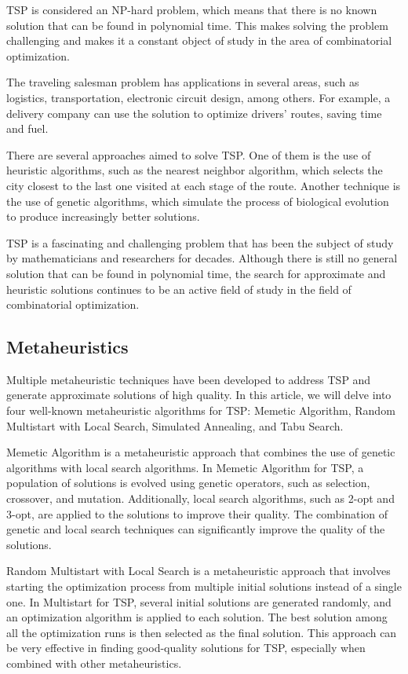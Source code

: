 \documentclass[conference]{IEEEtran}
\begin{document}
TSP is considered an NP-hard problem, which means that there is no known solution that can be found in polynomial time. This makes solving the problem challenging and makes it a constant object of study in the area of combinatorial optimization.

The traveling salesman problem has applications in several areas, such as logistics, transportation, electronic circuit design, among others. For example, a delivery company can use the solution to optimize drivers' routes, saving time and fuel.

There are several approaches aimed to solve TSP. One of them is the use of heuristic algorithms, such as the nearest neighbor algorithm, which selects the city closest to the last one visited at each stage of the route. Another technique is the use of genetic algorithms, which simulate the process of biological evolution to produce increasingly better solutions.

TSP is a fascinating and challenging problem that has been the subject of study by mathematicians and researchers for decades. Although there is still no general solution that can be found in polynomial time, the search for approximate and heuristic solutions continues to be an active field of study in the field of combinatorial optimization.

\subsection{Metaheuristics}

Multiple metaheuristic techniques have been developed to address TSP and generate approximate solutions of high quality. In this article, we will delve into four well-known metaheuristic algorithms for TSP: Memetic Algorithm, Random Multistart with Local Search, Simulated Annealing, and Tabu Search.

Memetic Algorithm is a metaheuristic approach that combines the use of genetic algorithms with local search algorithms. In Memetic Algorithm for TSP, a population of solutions is evolved using genetic operators, such as selection, crossover, and mutation. Additionally, local search algorithms, such as 2-opt and 3-opt, are applied to the solutions to improve their quality. The combination of genetic and local search techniques can significantly improve the quality of the solutions.

Random Multistart with Local Search is a metaheuristic approach that involves starting the optimization process from multiple initial solutions instead of a single one. In Multistart for TSP, several initial solutions are generated randomly, and an optimization algorithm is applied to each solution. The best solution among all the optimization runs is then selected as the final solution. This approach can be very effective in finding good-quality solutions for TSP, especially when combined with other metaheuristics.
\end{document}
